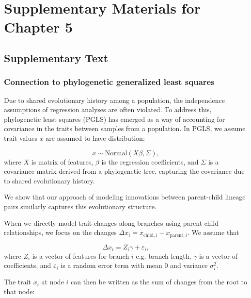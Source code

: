 \graphicspath{{./chapters/ncov-escape/}}

\chapter{Supplementary Materials for Chapter 5}

\section{Supplementary Text}

\subsection*{Connection to phylogenetic generalized least squares}\label{ssec:pgls}


Due to shared evolutionary history among a population, the independence assumptions of regression analyses are often violated.
To address this, phylogenetic least squares (PGLS) has emerged as a way of accounting for covariance in the traits between samples from a population.
In PGLS, we assume trait values $x$ are assumed to have distribution:

\begin{equation*}
x \sim \text{Normal}(X \beta,\Sigma),
\end{equation*}
where $X$ is matrix of features, $\beta$ is the regression coefficients, and $\Sigma$ is a covariance matrix derived from a phylogenetic tree, capturing the covariance due to shared evolutionary history.

We show that our approach of modeling innovations between parent-child lineage pairs similarly captures this evolutionary structure.

When we directly model trait changes along branches using parent-child relationships, we focus on the changes $\Delta x_i = x_{\text{child}, i} - x_{\text{parent}, i}$. We assume that

\begin{equation}
\Delta x_i = Z_i \gamma + \varepsilon_i,
\end{equation}
where $Z_i$ is a vector of features for branch $i$ e.g. branch length, $\gamma$ is a vector of coefficients, and $\varepsilon_i$ is a random error term with mean 0 and variance $\sigma_i^2$.

The trait $x_i$ at node $i$ can then be written as the sum of changes from the root to that node:

